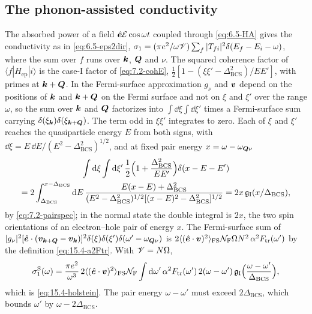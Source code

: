 \subsection*{The phonon-assisted conductivity}

The absorbed power of a field $\hat{\bm{e}}\mathcal{E}\cos\omega t$ coupled through \cref{eq:6.5-HA} gives the conductivity as in \cref{eq:6.5-eps2dir}, $\sigma_1 = (\pi e^2/\omega\mathscr{V})\sum_f|T_{fi}|^2\delta(E_f - E_i - \omega)$, where the sum over $f$ runs over $\bm{k}$, $\bm{Q}$ and $\nu$. The squared coherence factor of $\langle f|H_{\mathrm{ep}}|i\rangle$ is the case-I factor of \cref{eq:7.2-cohE}, $\frac12[1 - (\xi\xi' - \Delta_{\mathrm{BCS}}^2)/EE']$, with primes at $\bm{k}+\bm{Q}$. In the Fermi-surface approximation $g_\nu$ and $\bm{v}$ depend on the positions of $\bm{k}$ and $\bm{k}+\bm{Q}$ on the Fermi surface and not on $\xi$ and $\xi'$ over the range $\omega$, so the sum over $\bm{k}$ and $\bm{Q}$ factorizes into $\int\dd\xi\int\dd\xi'$ times a Fermi-surface sum carrying $\delta(\xi_{\bm{k}})\delta(\xi_{\bm{k}+\bm{Q}})$. The term odd in $\xi\xi'$ integrates to zero. Each of $\xi$ and $\xi'$ reaches the quasiparticle energy $E$ from both signs, with $\dd\xi = E\,\dd E/(E^2 - \Delta_{\mathrm{BCS}}^2)^{1/2}$, and at fixed pair energy $x = \omega - \omega_{\bm{Q}\nu}$
\begin{multline*}
  \int\mathrm{d}\xi\int\mathrm{d}\xi'\,\frac12\Bigl(1 + \frac{\Delta_{\mathrm{BCS}}^2}{EE'}\Bigr)\delta(x - E - E') \\
  = 2\int_{\Delta_{\mathrm{BCS}}}^{x - \Delta_{\mathrm{BCS}}}\mathrm{d} E\,\frac{E(x - E) + \Delta_{\mathrm{BCS}}^2}{(E^2 - \Delta_{\mathrm{BCS}}^2)^{1/2}[(x - E)^2 - \Delta_{\mathrm{BCS}}^2]^{1/2}}
  = 2x\,\mathfrak{g}_{\mathrm{I}}(x/\Delta_{\mathrm{BCS}}) ,
\end{multline*}
by \cref{eq:7.2-pairspec}; in the normal state the double integral is $2x$, the two spin orientations of an electron--hole pair of energy $x$. The Fermi-surface sum of $|g_\nu|^2[\hat{\bm{e}}\cdot(\bm{v}_{\bm{k}+\bm{Q}} - \bm{v}_{\bm{k}})]^2\delta(\xi)\delta(\xi')\delta(\omega' - \omega_{\bm{Q}\nu})$ is $2\langle(\hat{\bm{e}}\cdot\bm{v})^2\rangle_{\mathrm{FS}}\mathcal{N}_{\mathrm{F}}\Omega N^2\,\alpha^2F_{\mathrm{tr}}(\omega')$ by the definition \cref{eq:15.4-a2Ftr}. With $\mathscr{V} = N\Omega$,
\begin{equation*}
  \sigma_1^{\mathrm{S}}(\omega) = \frac{\pi e^2}{\omega^3}\,2\langle(\hat{\bm{e}}\cdot\bm{v})^2\rangle_{\mathrm{FS}}\mathcal{N}_{\mathrm{F}}\int\mathrm{d}\omega'\,\alpha^2F_{\mathrm{tr}}(\omega')\,2(\omega - \omega')\,\mathfrak{g}_{\mathrm{I}}\Bigl(\frac{\omega - \omega'}{\Delta_{\mathrm{BCS}}}\Bigr) ,
\end{equation*}
which is \cref{eq:15.4-holstein}. The pair energy $\omega - \omega'$ must exceed $2\Delta_{\mathrm{BCS}}$, which bounds $\omega'$ by $\omega - 2\Delta_{\mathrm{BCS}}$.

